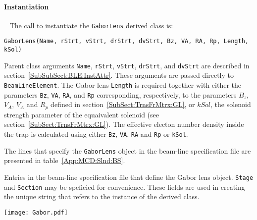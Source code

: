 \paragraph{Instantiation} ~\newline
\noindent
The call to instantiate the \texttt{GaborLens} derived class is:
\begin{center}
  \texttt{GaborLens(Name, rStrt, vStrt, drStrt, dvStrt,
          Bz, VA, RA, Rp, Length, kSol)}
\end{center}
Parent class arguments \texttt{Name}, \texttt{rStrt}, \texttt{vStrt},
\texttt{drStrt}, and \texttt{dvStrt} are described in
section~\ref{SubSubSect:BLE:InstAttr}.
These arguments are passed directly to \texttt{BeamLineElement}.
The Gabor lens \texttt{Length} is required together with either the
parameters \texttt{Bz}, \texttt{VA}, \texttt{RA}, and \texttt{Rp}
corresponding, respectively, to the parameters $B_z$, $V_A$, $V_A$ and
$R_p$ defined in section~\ref{SubSect:TrnsFrMtrx:GL}, or $kSol$, the
solenoid strength parameter of the equaivalent solenoid (see
section~\ref{SubSect:TrnsFrMtrx:GL}).
The effective electon number density inside the trap is calculated
using either \texttt{Bz}, \texttt{VA}, \texttt{RA} and \texttt{Rp}
or \texttt{kSol}.

The lines that specify the \texttt{GaborLens} object in the
beam-line specification file are presented in
table~\ref{App:MCD:Slnd:BS}. 
\begin{table}[h]
  \caption{
    Entries in the beam-line specification file that define the
    Gabor lens object.
    \texttt{Stage} and \texttt{Section} may be speficied for
    convenience.
    These fields are used in creating the unique string that refers
    to the instance of the derived class.
  }
  \label{App:MCD:Slnd:BS}
  \begin{center}
    \texttt{[image: Gabor.pdf]}
  \end{center}
\end{table}

